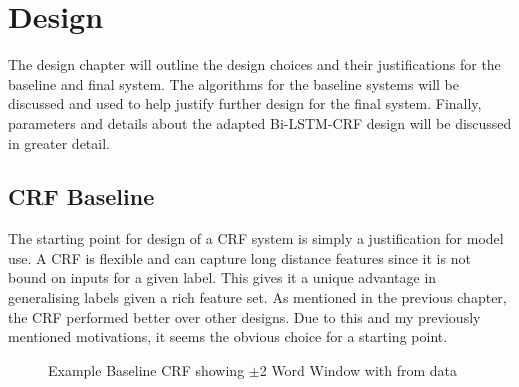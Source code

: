 \chapter{Design}\label{chapter4}

The design chapter will outline the design choices and their justifications for the baseline and final system. The algorithms for the baseline systems will be discussed and used to help justify further design for the final system. Finally, parameters and details about the adapted Bi-LSTM-CRF design will be discussed in greater detail.

\section{CRF Baseline}

The starting point for design of a CRF system is simply a justification for model use. A CRF is flexible and can capture long distance features since it is not bound on inputs for a given label. This gives it a unique advantage in generalising labels given a rich feature set. As mentioned in the previous chapter, the CRF performed better over other designs. Due to this and my previously mentioned motivations, it seems the obvious choice for a starting point.

\begin{figure}[H]
  \centering
  \tikzset{font=\footnotesize}
  \caption{Example Baseline CRF showing $\pm$2 Word Window with from \dimsum data}
  \label{fig:crfwindowgraydimsum}
\end{figure}

